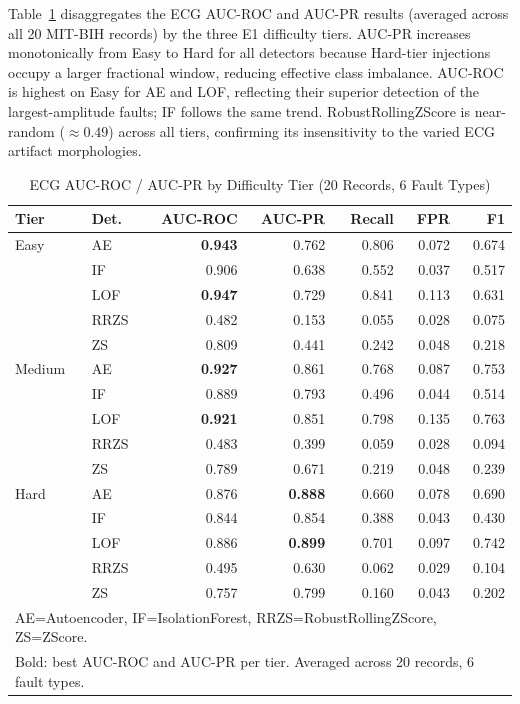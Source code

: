 \documentclass[conference]{IEEEtran}
\begin{document}
Table~\ref{tab:tier} disaggregates the ECG AUC-ROC and AUC-PR results (averaged across all 20 MIT-BIH records) by the three E1 difficulty tiers. AUC-PR increases monotonically from Easy to Hard for all detectors because Hard-tier injections occupy a larger fractional window, reducing effective class imbalance. AUC-ROC is highest on Easy for AE and LOF, reflecting their superior detection of the largest-amplitude faults; IF follows the same trend. RobustRollingZScore is near-random ($\approx\!0.49$) across all tiers, confirming its insensitivity to the varied ECG artifact morphologies.

\begin{table}[h]
\caption{ECG AUC-ROC / AUC-PR by Difficulty Tier (20 Records, 6 Fault Types)}
\label{tab:tier}
\centering
\scriptsize
\setlength{\tabcolsep}{2.5pt}
\begin{tabular}{@{}llrrrrr@{}}
\toprule
\textbf{Tier} & \textbf{Det.} & \textbf{AUC-ROC} & \textbf{AUC-PR} & \textbf{Recall} & \textbf{FPR} & \textbf{F1} \\
\midrule
Easy   & AE   & \textbf{0.943} & 0.762 & 0.806 & 0.072 & 0.674 \\
       & IF   & 0.906 & 0.638 & 0.552 & 0.037 & 0.517 \\
       & LOF  & \textbf{0.947} & 0.729 & 0.841 & 0.113 & 0.631 \\
       & RRZS & 0.482 & 0.153 & 0.055 & 0.028 & 0.075 \\
       & ZS   & 0.809 & 0.441 & 0.242 & 0.048 & 0.218 \\
\midrule
Medium & AE   & \textbf{0.927} & 0.861 & 0.768 & 0.087 & 0.753 \\
       & IF   & 0.889 & 0.793 & 0.496 & 0.044 & 0.514 \\
       & LOF  & \textbf{0.921} & 0.851 & 0.798 & 0.135 & 0.763 \\
       & RRZS & 0.483 & 0.399 & 0.059 & 0.028 & 0.094 \\
       & ZS   & 0.789 & 0.671 & 0.219 & 0.048 & 0.239 \\
\midrule
Hard   & AE   & 0.876 & \textbf{0.888} & 0.660 & 0.078 & 0.690 \\
       & IF   & 0.844 & 0.854 & 0.388 & 0.043 & 0.430 \\
       & LOF  & 0.886 & \textbf{0.899} & 0.701 & 0.097 & 0.742 \\
       & RRZS & 0.495 & 0.630 & 0.062 & 0.029 & 0.104 \\
       & ZS   & 0.757 & 0.799 & 0.160 & 0.043 & 0.202 \\
\bottomrule
\multicolumn{7}{l}{\scriptsize AE=Autoencoder, IF=IsolationForest, RRZS=RobustRollingZScore, ZS=ZScore.} \\
\multicolumn{7}{l}{\scriptsize Bold: best AUC-ROC and AUC-PR per tier. Averaged across 20 records, 6 fault types.}
\end{tabular}
\end{table}
\end{document}
